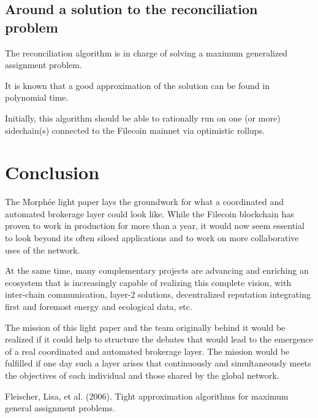 \documentclass[twoside,twocolumn]{article}
\begin{document}
\subsection{Around a solution to the reconciliation problem}

The reconciliation algorithm is in charge of solving a maximum generalized assignment problem.

It is known that a good approximation of the solution can be found in polynomial time. \cite{Fleischer:2006}

Initially, this algorithm should be able to rationally run on one (or more) sidechain(s) connected to the Filecoin mainnet via optimistic rollups.


\section{Conclusion}

The Morphée light paper lays the groundwork for what a coordinated and automated
brokerage layer could look like.
While the Filecoin blockchain has proven to work in production for more than a year,
it would now seem essential to look beyond its often siloed applications and to work on more collaborative uses of the network.

At the same time, many complementary projects are advancing and enriching an ecosystem that is increasingly capable
of realizing this complete vision, with inter-chain communication, layer-2 solutions, decentralized reputation
integrating first and foremost energy and ecological data, etc.

The mission of this light paper and the team originally behind it would be realized if it could help to structure
the debates that would lead to the emergence of a real coordinated and automated brokerage layer.
The mission would be fulfilled if one day such a layer arises that continuously and simultaneously
meets the objectives of each individual and those shared by the global network.



\begin{thebibliography}{99} %

Fleischer, Lisa, et al. (2006).
\newblock Tight approximation algorithms for maximum general assignment problems.

\end{thebibliography}

\end{document}
